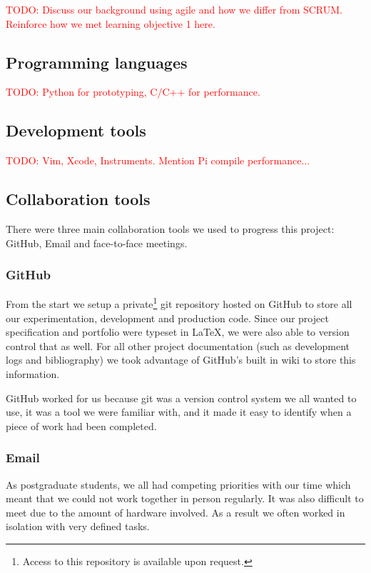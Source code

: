 \documentclass[11pt,a4paper,titlepage]{report}
\begin{document}
\textcolor{red}{TODO: Discuss our background using agile and how we differ from SCRUM. Reinforce how we met learning objective 1 here.}


\subsection{Programming languages}

\textcolor{red}{TODO: Python for prototyping, C/C++ for performance.}


\subsection{Development tools}

\textcolor{red}{TODO: Vim, Xcode, Instruments. Mention Pi compile performance...}

\subsection{Collaboration tools}

There were three main collaboration tools we used to progress this project: GitHub, Email and face-to-face meetings.

\subsubsection{GitHub}

From the start we setup a private\footnote{Access to this repository is available upon request.} git repository hosted on GitHub to store all our experimentation, development and production code. Since our project specification and portfolio were typeset in \LaTeX, we were also able to version control that as well. For all other project documentation (such as development logs and bibliography) we took advantage of GitHub's built in wiki to store this information.

GitHub worked for us because git was a version control system we all wanted to use, it was a tool we were familiar with, and it made it easy to identify when a piece of work had been completed.

\subsubsection{Email}

As postgraduate students, we all had competing priorities with our time which meant that we could not work together in person regularly. It was also difficult to meet due to the amount of hardware involved. As a result we often worked in isolation with very defined tasks.
\end{document}
